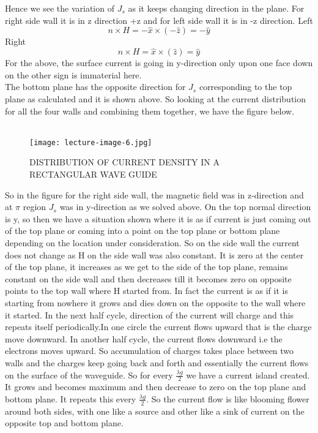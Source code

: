 	Hence we see the variation of $J_{s}$ as it keeps changing direction in the plane. For right side wall it is in z direction +z and for left side wall it is in -z direction.
Left   \begin{equation}
	n\times H = -\hat{x} \times (-\hat{z})= -\hat{y}
				\end{equation}
Right  \begin{equation}
     	n\times H = \hat{x} \times (\hat{z}) = \hat{y}
		\end{equation}
	For the above, the surface current is going in y-direction only upon one face down on the other sign is immaterial here.\\
		
	The bottom plane has the opposite direction for $J_{s}$ corresponding to the top plane as calculated and it is shown above. So looking at the current distribution for all the four walls and combining them together, we have the figure below.\\\\
	
	\begin{figure}[H]
		\centering
		\texttt{[image: lecture-image-6.jpg]}
		\caption{DISTRIBUTION OF CURRENT DENSITY IN A RECTANGULAR WAVE GUIDE}
	\end{figure}
	
	So in the figure for the right side wall, the magnetic field was in z-direction and at $\pi$ region $J_{s}$ was in y-direction as we solved above. On the top normal direction is y, so then we have a situation shown where it is as if current is just coming out of the top plane or coming into a point on the top plane or bottom plane depending on the location under 
	consideration. So on the side wall the current does not change as H on the side wall was also constant. It is zero at the center of the top plane, it increases as we get to the side of the top plane, remains constant on the side wall and then decreases till it becomes zero on opposite points to the top wall where H started from. In fact the current is as if it is starting from nowhere it grows and dies down on the opposite to the wall where it started. In the next half cycle, direction of the current will charge and this repeats itself periodically.In one circle the current flows upward that is the charge move downward. In another half cycle, the current flows downward i.e the electrons moves upward. So accumulation of charges takes place between two walls and the charges keep going back and forth and essentially the current flows on the surface of the waveguide. So for every $\frac{\lambda g}{2}$ we have a current island created. It grows and becomes maximum and then decrease to zero on the top plane and bottom plane. It repeats this every $\frac{\lambda g}{2}$. So the current flow is like blooming flower around both sides, with one like a source and other like a sink of current on the opposite top and bottom plane.
		
